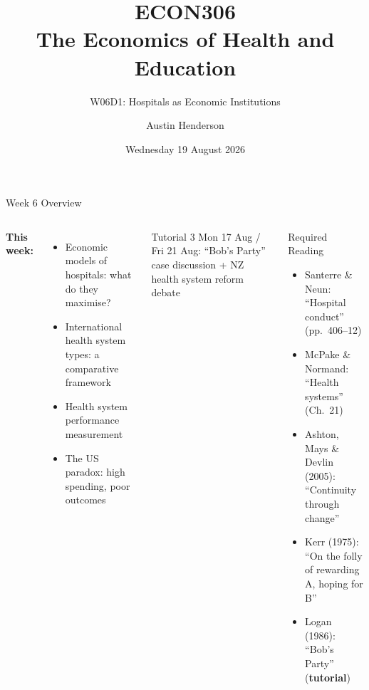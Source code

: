 \documentclass[aspectratio=169, 12pt]{beamer}
\title[ECON306: W06D1 — Hospital Economics]{ECON306\\The Economics of Health and Education}
\subtitle{W06D1: Hospitals as Economic Institutions}
\author{Austin Henderson}
\institute{Department of Economics\\University of Otago}
\date{Wednesday 19 August 2026}
\begin{document}
\begin{frame}[plain]
  \titlepage
\end{frame}



\begin{frame}{Week 6 Overview}
  \begin{columns}
      \textbf{This week:}
      \begin{itemize}
        \item Economic models of hospitals: what do they maximise?
        \item International health system types: a comparative framework
        \item Health system performance measurement
        \item The US paradox: high spending, poor outcomes
      \end{itemize}
      \begin{exampleblock}{Tutorial 3}
        \footnotesize Mon 17 Aug / Fri 21 Aug: ``Bob's Party'' case discussion + NZ health system reform debate
      \end{exampleblock}
      \begin{block}{Required Reading}
        \footnotesize
        \begin{itemize}
          \item Santerre \& Neun: ``Hospital conduct'' (pp.\ 406--12)
          \item McPake \& Normand: ``Health systems'' (Ch.\ 21)
          \item Ashton, Mays \& Devlin (2005): ``Continuity through change''
          \item Kerr (1975): ``On the folly of rewarding A, hoping for B''
          \item Logan (1986): ``Bob's Party'' (\textbf{tutorial})
        \end{itemize}
      \end{block}
  \end{columns}
\end{frame}
\end{document}
